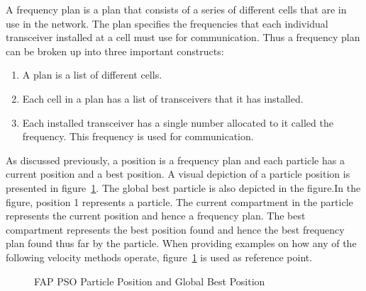 A frequency plan is a plan that consists of a series of different cells that are in use in the network. The plan specifies the frequencies that each individual transceiver installed at a cell must use for communication. Thus a frequency plan can be broken up into three important constructs:
\begin{enumerate}
\item A plan is a list of different cells.
\item Each cell in a plan has a list of transceivers that it has installed.
\item Each installed transceiver has a single number allocated to it called the frequency. This frequency is used for communication.
\end{enumerate}

As discussed previously, a position is a frequency plan and each particle has a current position and a best position. A visual depiction of a particle position is presented in figure~\ref{fig:fapparticlepos}. The global best particle is also depicted in the figure.In the figure, position 1 represents a particle. The current compartment in the particle represents the current position and hence a frequency plan. The best compartment represents the best position found and hence the best frequency plan found thus far by the particle. When providing examples on how any of the following velocity methods operate, figure~\ref{fig:fapparticlepos} is used as reference point.
\begin{figure}[ht]
	\centering
	\setlength \fboxsep{0pt}
	\setlength \fboxrule{0.5pt}
	\caption{FAP PSO Particle Position and Global Best Position}
	\label{fig:fapparticlepos}
\end{figure}

